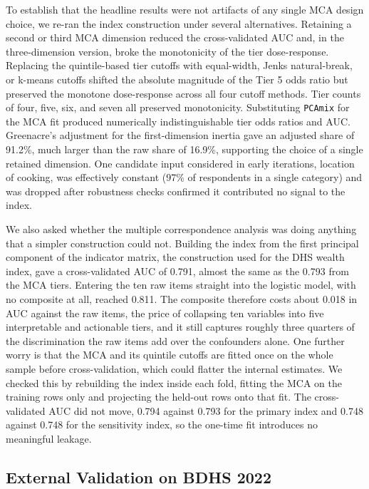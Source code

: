 \documentclass[
  12pt,
  a4paper]{article}
\begin{document}
To establish that the headline results were not artifacts of any single MCA design choice, we re-ran the index construction under several alternatives. Retaining a second or third MCA dimension reduced the cross-validated AUC and, in the three-dimension version, broke the monotonicity of the tier dose-response. Replacing the quintile-based tier cutoffs with equal-width, Jenks natural-break, or k-means cutoffs shifted the absolute magnitude of the Tier 5 odds ratio but preserved the monotone dose-response across all four cutoff methods. Tier counts of four, five, six, and seven all preserved monotonicity. Substituting \texttt{PCAmix} for the MCA fit produced numerically indistinguishable tier odds ratios and AUC. Greenacre's adjustment for the first-dimension inertia gave an adjusted share of 91.2\%, much larger than the raw share of 16.9\%, supporting the choice of a single retained dimension. One candidate input considered in early iterations, location of cooking, was effectively constant (97\% of respondents in a single category) and was dropped after robustness checks confirmed it contributed no signal to the index.

We also asked whether the multiple correspondence analysis was doing anything that a simpler construction could not. Building the index from the first principal component of the indicator matrix, the construction used for the DHS wealth index, gave a cross-validated AUC of 0.791, almost the same as the 0.793 from the MCA tiers. Entering the ten raw items straight into the logistic model, with no composite at all, reached 0.811. The composite therefore costs about 0.018 in AUC against the raw items, the price of collapsing ten variables into five interpretable and actionable tiers, and it still captures roughly three quarters of the discrimination the raw items add over the confounders alone. One further worry is that the MCA and its quintile cutoffs are fitted once on the whole sample before cross-validation, which could flatter the internal estimates. We checked this by rebuilding the index inside each fold, fitting the MCA on the training rows only and projecting the held-out rows onto that fit. The cross-validated AUC did not move, 0.794 against 0.793 for the primary index and 0.748 against 0.748 for the sensitivity index, so the one-time fit introduces no meaningful leakage.

\subsection{External Validation on BDHS 2022}\label{external-validation-on-bdhs-2022}
\end{document}
